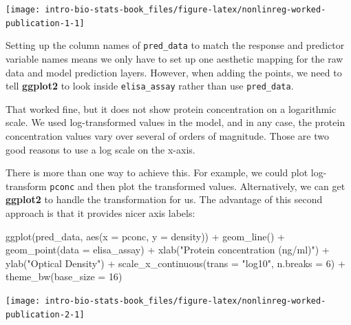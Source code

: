 \documentclass[
]{book}
\newenvironment{Shaded}{\begin{snugshade}}{\end{snugshade}}
\newcommand{\AttributeTok}[1]{\textcolor[rgb]{0.77,0.63,0.00}{#1}}
\newcommand{\DecValTok}[1]{\textcolor[rgb]{0.00,0.00,0.81}{#1}}
\newcommand{\FunctionTok}[1]{\textcolor[rgb]{0.00,0.00,0.00}{#1}}
\newcommand{\NormalTok}[1]{#1}
\newcommand{\SpecialCharTok}[1]{\textcolor[rgb]{0.00,0.00,0.00}{#1}}
\newcommand{\StringTok}[1]{\textcolor[rgb]{0.31,0.60,0.02}{#1}}
\begin{document}
\begin{center}\texttt{[image: intro-bio-stats-book\_files/figure-latex/nonlinreg-worked-publication-1-1]} \end{center}

Setting up the column names of \texttt{pred\_data} to match the response and predictor variable names means we only have to set up one aesthetic mapping for the raw data and model prediction layers. However, when adding the points, we need to tell \textbf{ggplot2} to look inside \texttt{elisa\_assay} rather than use \texttt{pred\_data}.

That worked fine, but it does not show protein concentration on a logarithmic scale. We used log-transformed values in the model, and in any case, the protein concentration values vary over several of orders of magnitude. Those are two good reasons to use a log scale on the x-axis.

There is more than one way to achieve this. For example, we could plot log-transform \texttt{pconc} and then plot the transformed values. Alternatively, we can get \textbf{ggplot2} to handle the transformation for us. The advantage of this second approach is that it provides nicer axis labels:

\begin{Shaded}
\begin{Highlighting}[]
\FunctionTok{ggplot}\NormalTok{(pred\_data, }\FunctionTok{aes}\NormalTok{(}\AttributeTok{x =}\NormalTok{ pconc, }\AttributeTok{y =}\NormalTok{ density)) }\SpecialCharTok{+} 
  \FunctionTok{geom\_line}\NormalTok{() }\SpecialCharTok{+} \FunctionTok{geom\_point}\NormalTok{(}\AttributeTok{data =}\NormalTok{ elisa\_assay) }\SpecialCharTok{+} 
  \FunctionTok{xlab}\NormalTok{(}\StringTok{"Protein concentration (ng/ml)"}\NormalTok{) }\SpecialCharTok{+} \FunctionTok{ylab}\NormalTok{(}\StringTok{"Optical Density"}\NormalTok{) }\SpecialCharTok{+} 
  \FunctionTok{scale\_x\_continuous}\NormalTok{(}\AttributeTok{trans =} \StringTok{"log10"}\NormalTok{, }\AttributeTok{n.breaks =} \DecValTok{6}\NormalTok{) }\SpecialCharTok{+}
  \FunctionTok{theme\_bw}\NormalTok{(}\AttributeTok{base\_size =} \DecValTok{16}\NormalTok{)}
\end{Highlighting}
\end{Shaded}

\begin{center}\texttt{[image: intro-bio-stats-book\_files/figure-latex/nonlinreg-worked-publication-2-1]} \end{center}
\end{document}
